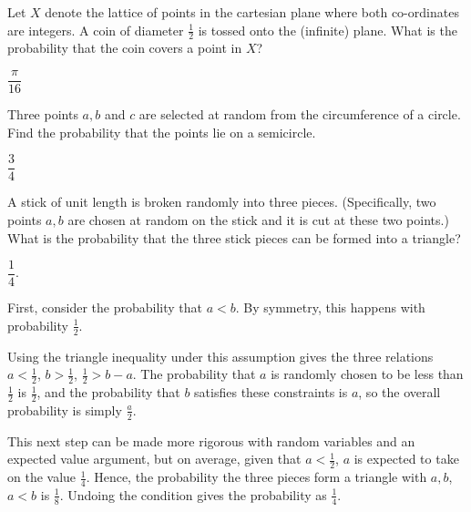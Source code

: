\documentclass[../main.tex]{subfiles}
\begin{document}
\begin{example}
	Let $X$ denote the lattice of points in the cartesian 
	plane where both co-ordinates are integers. A coin
	of diameter $\frac12$ is tossed onto the (infinite) plane.
	What is the probability that the coin covers a point in $X$?
\end{example}

\begin{solution}[Answer.]
	$\dfrac{\pi}{16}$
\end{solution}

\begin{example}
	Three points $a,b$ and $c$ are selected at random from the circumference of a circle. Find the probability that the
	points lie on a semicircle.
\end{example}

\begin{solution}[Answer.]
	$\dfrac34$
\end{solution}

\begin{example}
	A stick of unit length is broken randomly into three pieces. (Specifically, two points $a,b$ are chosen at random on the
	stick and it is cut at these two points.) What is the probability
	that the three stick pieces can be formed into a triangle?
\end{example}

\begin{solution}[Answer.]
	$\dfrac{1}{4}$. 
\end{solution}

\begin{solution}
First, consider the probability that $a < b$. By symmetry, this happens with probability $\frac{1}{2}$. 

Using the triangle inequality under this assumption gives the three relations $a < \frac{1}{2}$, $b > \frac{1}{2}$, $\frac{1}{2} > b-a$. The probability that $a$ is randomly chosen to be less than $\frac{1}{2}$ is $\frac{1}{2}$, and the probability that $b$ satisfies these constraints is $a$, so the overall probability is simply $\frac{a}{2}$. 

This next step can be made more rigorous with random variables and an expected value argument, but on average, given that $a < \frac 12$, $a$ is expected to take on the value $\frac 14$. Hence, the probability the three pieces form a triangle with $a, b$, $a < b$ is $\frac 18$. Undoing the condition gives the probability as $\frac 14$. 
\end{solution}
\end{document}
